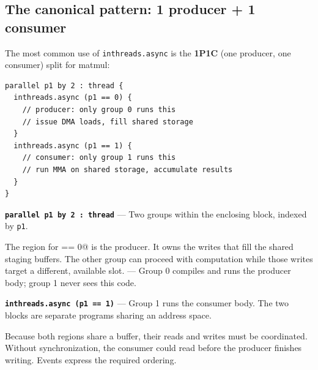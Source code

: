 \subsection*{The canonical pattern: 1 producer + 1 consumer}

The most common use of \texttt{inthreads.\allowbreak{}async} is the \textbf{1P1C} (one producer, one consumer) split for matmul:

\begin{lstlisting}[language=croqtile,caption={The canonical pattern: 1 producer 1 consumer}]
parallel p1 by 2 : thread {
  inthreads.async (p1 == 0) {
    // producer: only group 0 runs this
    // issue DMA loads, fill shared storage
  }
  inthreads.async (p1 == 1) {
    // consumer: only group 1 runs this
    // run MMA on shared storage, accumulate results
  }
}
\end{lstlisting}

\textbf{\texttt{parallel p1 by 2 :\allowbreak{} thread}} --- Two groups within the enclosing block, indexed by \texttt{p1}.

The region for  == 0@ is the producer. It owns the writes that fill the shared staging buffers. The other group can proceed with computation while those writes target a different, available slot. --- Group 0 compiles and runs the producer body; group 1 never sees this code.

\textbf{\texttt{inthreads.\allowbreak{}async (p1 == 1)}} --- Group 1 runs the consumer body. The two blocks are separate programs sharing an address space.

Because both regions share a buffer, their reads and writes must be coordinated. Without synchronization, the consumer could read before the producer finishes writing. Events express the required ordering.
